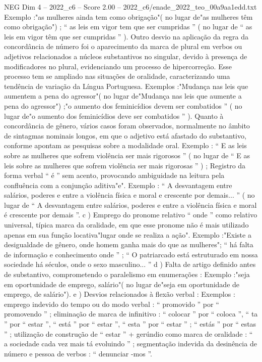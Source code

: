 \begin{textsample}{NEG Dim 4 – 2022\_c6 – Score 2.00 – 2022\_c6/enade\_2022\_teo\_00a9aa1edd.txt}
Exemplo :"as mulheres ainda tem como obrigação"( no lugar de"as mulheres têm como obrigação") ; “ as leis em vigor tem que ser cumpridas ” ( no lugar de “ as leis em vigor têm que ser cumpridas ” ).
Outro desvio na aplicação da regra da concordância de número foi o aparecimento da marca de plural em verbos ou adjetivos relacionados a núcleos substantivos no singular, devido à presença de modificadores no plural, evidenciando um processo de hipercorreção.
Esse processo tem se ampliado nas situações de oralidade, caracterizando uma tendência de variação da Língua Portuguesa.
Exemplos :"Mudança nas leis que aumentem a pena do agressor"( no lugar de"Mudança nas leis que aumente a pena do agressor") ;"o aumento dos feminicídios devem ser combatidos ” ( no lugar de"o aumento dos feminicídios deve ser combatidos ” ).
Quanto à concordância de gênero, vários casos foram observados, normalmente no âmbito de sintagmas nominais longos, em que o adjetivo está afastado do substantivo, conforme apontam as pesquisas sobre a modalidade oral.
Exemplo : “ E as leis sobre as mulheres que sofrem violência ser mais rigorosos ” ( no lugar de “ E as leis sobre as mulheres que sofrem violência ser mais rigorosas ” ) ; Registro da forma verbal “ é ” sem acento, provocando ambiguidade na leitura pela confluência com a conjunção aditiva"e".
Exemplo : “ A desvantagem entre salários, poderes e entre a violência física e moral e crescente por demais... ” ( no lugar de “ A desvantagem entre salários, poderes e entre a violência física e moral é crescente por demais ”. c ) Emprego do pronome relativo “ onde ” como relativo universal, típica marca da oralidade, em que esse pronome não é mais utilizado apenas em sua função locativa"lugar onde se realiza a ação".
Exemplo :"Existe a desigualdade de gênero, onde homem ganha mais do que as mulheres"; “ há falta de informação e conhecimento onde ” ; “ O patriarcado está estruturado em nossa sociedade há séculos, onde o sexo masculino... ” d ) Falta de artigo definido antes de substantivo, comprometendo o paralelismo em enumerações : Exemplo :"seja em oportunidade de emprego, salário"( no lugar de"seja em oportunidade de emprego, de salário"). e ) Desvios relacionados à flexão verbal : Exemplos : emprego indevido do tempo ou do modo verbal : “ promovido ” por “ promovendo ” ; eliminação de marca de infinitivo : “ colocar ” por “ coloca ”, “ ta ” por “ estar ”, “ está ” por “ estar ”, “ esta ” por “ estar ” ; “ estás ” por “ estas ” ; utilização de construção de “ estar ” + gerúndio como marca de oralidade : “ a sociedade cada vez mais tá evoluindo ” ; segmentação indevida da desinência de número e pessoa de verbos : “ denunciar -mos ”.

\end{textsample}

